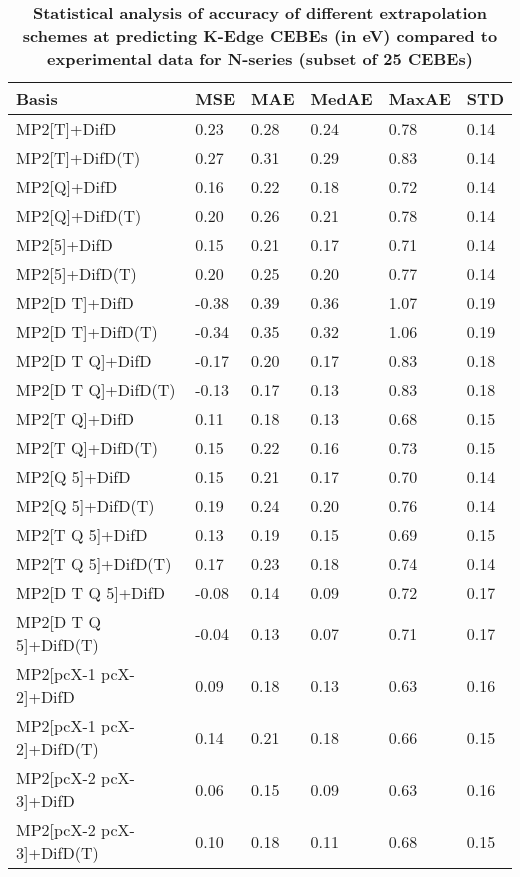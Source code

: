 \begin{table}
  \caption{\textbf{Statistical analysis of accuracy of different extrapolation schemes at predicting K-Edge CEBEs (in eV) compared to experimental data for N-series (subset of 25 CEBEs)}}
  \begin{tabular}{l l l l l l }
    \toprule
    \textbf{Basis} & \textbf{MSE} & \textbf{MAE} & \textbf{MedAE} & \textbf{MaxAE} & \textbf{STD} \\ 
    \midrule
    MP2[T]+DifD & 0.23 & 0.28 & 0.24 & 0.78 & 0.14 \\ 
    MP2[T]+DifD(T) & 0.27 & 0.31 & 0.29 & 0.83 & 0.14 \\ 
    MP2[Q]+DifD & 0.16 & 0.22 & 0.18 & 0.72 & 0.14 \\ 
    MP2[Q]+DifD(T) & 0.20 & 0.26 & 0.21 & 0.78 & 0.14 \\ 
    MP2[5]+DifD & 0.15 & 0.21 & 0.17 & 0.71 & 0.14 \\ 
    MP2[5]+DifD(T) & 0.20 & 0.25 & 0.20 & 0.77 & 0.14 \\ 
    MP2[D T]+DifD & -0.38 & 0.39 & 0.36 & 1.07 & 0.19 \\ 
    MP2[D T]+DifD(T) & -0.34 & 0.35 & 0.32 & 1.06 & 0.19 \\ 
    MP2[D T Q]+DifD & -0.17 & 0.20 & 0.17 & 0.83 & 0.18 \\ 
    MP2[D T Q]+DifD(T) & -0.13 & 0.17 & 0.13 & 0.83 & 0.18 \\ 
    MP2[T Q]+DifD & 0.11 & 0.18 & 0.13 & 0.68 & 0.15 \\ 
    MP2[T Q]+DifD(T) & 0.15 & 0.22 & 0.16 & 0.73 & 0.15 \\ 
    MP2[Q 5]+DifD & 0.15 & 0.21 & 0.17 & 0.70 & 0.14 \\ 
    MP2[Q 5]+DifD(T) & 0.19 & 0.24 & 0.20 & 0.76 & 0.14 \\ 
    MP2[T Q 5]+DifD & 0.13 & 0.19 & 0.15 & 0.69 & 0.15 \\ 
    MP2[T Q 5]+DifD(T) & 0.17 & 0.23 & 0.18 & 0.74 & 0.14 \\ 
    MP2[D T Q 5]+DifD & -0.08 & 0.14 & 0.09 & 0.72 & 0.17 \\ 
    MP2[D T Q 5]+DifD(T) & -0.04 & 0.13 & 0.07 & 0.71 & 0.17 \\ 
    MP2[pcX-1 pcX-2]+DifD & 0.09 & 0.18 & 0.13 & 0.63 & 0.16 \\ 
    MP2[pcX-1 pcX-2]+DifD(T) & 0.14 & 0.21 & 0.18 & 0.66 & 0.15 \\ 
    MP2[pcX-2 pcX-3]+DifD & 0.06 & 0.15 & 0.09 & 0.63 & 0.16 \\ 
    MP2[pcX-2 pcX-3]+DifD(T) & 0.10 & 0.18 & 0.11 & 0.68 & 0.15 \\ 

\end{tabular}
\end{table}
